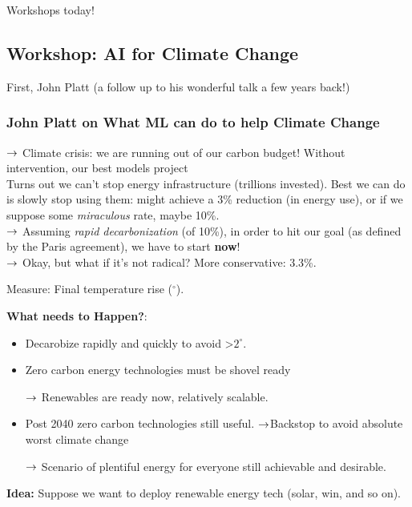Workshops today!

\subsection{Workshop: AI for Climate Change}

First, John Platt (a follow up to his wonderful talk a few years back!)

\subsubsection{John Platt on What ML can do to help Climate Change}


$\rightarrow$ Climate crisis: we are running out of our carbon budget! Without intervention, our best models project \\

Turns out we can't stop energy infrastructure (trillions invested). Best we can do is slowly stop using them: might achieve a 3\% reduction (in energy use), or if we suppose some {\it miraculous} rate, maybe 10\%.\\

$\rightarrow$ Assuming {\it rapid decarbonization} (of 10\%), in order to hit our goal (as defined by the Paris agreement), we have to start {\bf now}! \\

$\rightarrow$ Okay, but what if it's not radical? More conservative: 3.3\%.

Measure: Final temperature rise ($^\circ$).

{\bf What needs to Happen?}:
\begin{itemize}
    \item Decarobize rapidly and quickly to avoid >$2^\circ$.
    \item Zero carbon energy technologies must be shovel ready
    
    $\rightarrow$ Renewables are ready now, relatively scalable.
    
    \item Post 2040 zero carbon technologies still useful.
    $\rightarrow$Backstop to avoid absolute worst climate change
    
    $\rightarrow$ Scenario of plentiful energy for everyone still achievable and desirable.
    
    
\end{itemize}


{\bf Idea:} Suppose we want to deploy renewable energy tech (solar, win, and so on). \\

